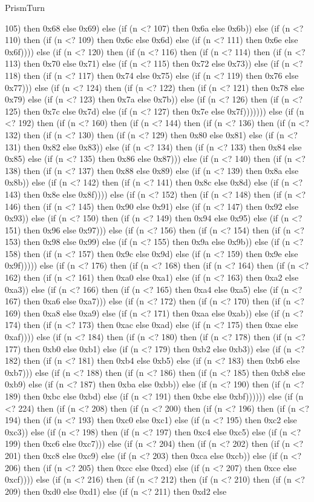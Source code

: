 \begin{lexlean}{PrismTurn}
\begin{semanticmodule}
{105) then 0x68 else 0x69) else (if (n <? 107) then 0x6a else 0x6b)) else (if (n <? 110) then (if (n <? 109) then 0x6c else 0x6d) else (if (n <? 111) then 0x6e else 0x6f)))) else (if (n <? 120) then (if (n <? 116) then (if (n <? 114) then (if (n <? 113) then 0x70 else 0x71) else (if (n <? 115) then 0x72 else 0x73)) else (if (n <? 118) then (if (n <? 117) then 0x74 else 0x75) else (if (n <? 119) then 0x76 else 0x77))) else (if (n <? 124) then (if (n <? 122) then (if (n <? 121) then 0x78 else 0x79) else (if (n <? 123) then 0x7a else 0x7b)) else (if (n <? 126) then (if (n <? 125) then 0x7c else 0x7d) else (if (n <? 127) then 0x7e else 0x7f))))))) else (if (n <? 192) then (if (n <? 160) then (if (n <? 144) then (if (n <? 136) then (if (n <? 132) then (if (n <? 130) then (if (n <? 129) then 0x80 else 0x81) else (if (n <? 131) then 0x82 else 0x83)) else (if (n <? 134) then (if (n <? 133) then 0x84 else 0x85) else (if (n <? 135) then 0x86 else 0x87))) else (if (n <? 140) then (if (n <? 138) then (if (n <? 137) then 0x88 else 0x89) else (if (n <? 139) then 0x8a else 0x8b)) else (if (n <? 142) then (if (n <? 141) then 0x8c else 0x8d) else (if (n <? 143) then 0x8e else 0x8f)))) else (if (n <? 152) then (if (n <? 148) then (if (n <? 146) then (if (n <? 145) then 0x90 else 0x91) else (if (n <? 147) then 0x92 else 0x93)) else (if (n <? 150) then (if (n <? 149) then 0x94 else 0x95) else (if (n <? 151) then 0x96 else 0x97))) else (if (n <? 156) then (if (n <? 154) then (if (n <? 153) then 0x98 else 0x99) else (if (n <? 155) then 0x9a else 0x9b)) else (if (n <? 158) then (if (n <? 157) then 0x9c else 0x9d) else (if (n <? 159) then 0x9e else 0x9f))))) else (if (n <? 176) then (if (n <? 168) then (if (n <? 164) then (if (n <? 162) then (if (n <? 161) then 0xa0 else 0xa1) else (if (n <? 163) then 0xa2 else 0xa3)) else (if (n <? 166) then (if (n <? 165) then 0xa4 else 0xa5) else (if (n <? 167) then 0xa6 else 0xa7))) else (if (n <? 172) then (if (n <? 170) then (if (n <? 169) then 0xa8 else 0xa9) else (if (n <? 171) then 0xaa else 0xab)) else (if (n <? 174) then (if (n <? 173) then 0xac else 0xad) else (if (n <? 175) then 0xae else 0xaf)))) else (if (n <? 184) then (if (n <? 180) then (if (n <? 178) then (if (n <? 177) then 0xb0 else 0xb1) else (if (n <? 179) then 0xb2 else 0xb3)) else (if (n <? 182) then (if (n <? 181) then 0xb4 else 0xb5) else (if (n <? 183) then 0xb6 else 0xb7))) else (if (n <? 188) then (if (n <? 186) then (if (n <? 185) then 0xb8 else 0xb9) else (if (n <? 187) then 0xba else 0xbb)) else (if (n <? 190) then (if (n <? 189) then 0xbc else 0xbd) else (if (n <? 191) then 0xbe else 0xbf)))))) else (if (n <? 224) then (if (n <? 208) then (if (n <? 200) then (if (n <? 196) then (if (n <? 194) then (if (n <? 193) then 0xc0 else 0xc1) else (if (n <? 195) then 0xc2 else 0xc3)) else (if (n <? 198) then (if (n <? 197) then 0xc4 else 0xc5) else (if (n <? 199) then 0xc6 else 0xc7))) else (if (n <? 204) then (if (n <? 202) then (if (n <? 201) then 0xc8 else 0xc9) else (if (n <? 203) then 0xca else 0xcb)) else (if (n <? 206) then (if (n <? 205) then 0xcc else 0xcd) else (if (n <? 207) then 0xce else 0xcf)))) else (if (n <? 216) then (if (n <? 212) then (if (n <? 210) then (if (n <? 209) then 0xd0 else 0xd1) else (if (n <? 211) then 0xd2 else }
\end{semanticmodule}
\end{lexlean}
